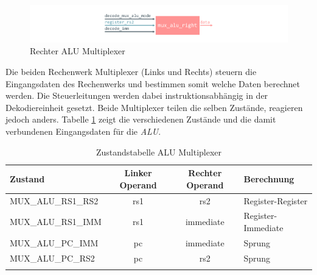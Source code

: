             \begin{figure}[H]
                \centering
                \includegraphics[scale=1]{img/block_mux_alu_right.pdf}
                \caption{Rechter ALU Multiplexer}
                \label{fig:alu}
            \end{figure}

            Die beiden Rechenwerk Multiplexer (Links und Rechts) steuern die Eingangsdaten des Rechenwerks und bestimmen somit welche Daten
            berechnet werden. Die Steuerleitungen werden dabei instruktionsabhängig in der Dekodiereinheit gesetzt.
            Beide Multiplexer teilen die selben Zustände, reagieren jedoch anders.
            Tabelle \ref{tab:alu-mux} zeigt die verschiedenen Zustände und die damit verbundenen Eingangsdaten für die \textit{ALU}.


            \begin{center}
                \begin{longtable}{| l | c | c | l |}
                    \hline
                        Zustand & Linker Operand & Rechter Operand & Berechnung \\
                    \hline
                        MUX\_ALU\_RS1\_RS2 & rs1 & rs2 & Register-Register \\
                    \hline
                        MUX\_ALU\_RS1\_IMM & rs1 & immediate &  Register-Immediate\\
                    \hline
                        MUX\_ALU\_PC\_IMM & pc & immediate & Sprung \\
                    \hline
                        MUX\_ALU\_PC\_RS2 & pc & rs2 & Sprung \\
                    \hline
                    \caption[Zustandstabelle ALU Multiplexer]{Zustandstabelle ALU Multiplexer}
                    \label{tab:alu-mux}
                \end{longtable}
            \end{center}

            
            

